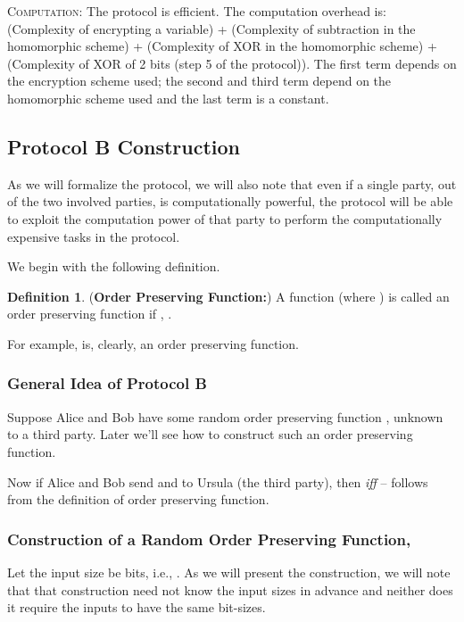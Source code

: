 \documentclass[11pt, letterpaper, romanappendices, onecolumn]{article}
\theoremstyle{plain}\newtheorem{thm}{Theorem}[section]
\theoremstyle{definition}
\newtheorem{defn}{Definition}[section]
\theoremstyle{remark}
\begin{document}
\par \textsc{Computation}: The protocol is efficient. The computation overhead is: (Complexity of encrypting a variable) + (Complexity of subtraction in the homomorphic scheme) + (Complexity of XOR in the homomorphic scheme) + (Complexity of XOR of 2 bits (step 5 of the protocol)). The first term depends on the encryption scheme used; the second and third term depend on the homomorphic scheme used and the last term is a constant.

\subsection{Protocol \textsf{B} Construction}
As we will formalize the protocol, we will also note that even if a single party, out of the two involved parties, is computationally powerful, the protocol will be able to exploit the computation power of that party to perform the computationally expensive tasks in the protocol.
\par We begin with the following definition.
\begin{defn}
(\textbf{Order Preserving Function:}) A function  (where ) is called an order preserving function if  , .
\end{defn}
For example,  is, clearly, an order preserving function.
\newline

\subsubsection{General Idea of Protocol \textsf{B}}
\par Suppose Alice and Bob have some random order preserving function , unknown to a third party. Later we'll see how to construct such an order preserving function.

\par Now if Alice and Bob send  and  to Ursula (the third party), then  \textit{iff}  -- follows from the definition of order preserving function.
\newline

\subsubsection{Construction of a Random Order Preserving Function, }
\par Let the input size be  bits, i.e., . As we will present the construction, we will note that that construction need not know the input sizes in advance and neither does it
require the inputs to have the same bit-sizes.
\end{document}
